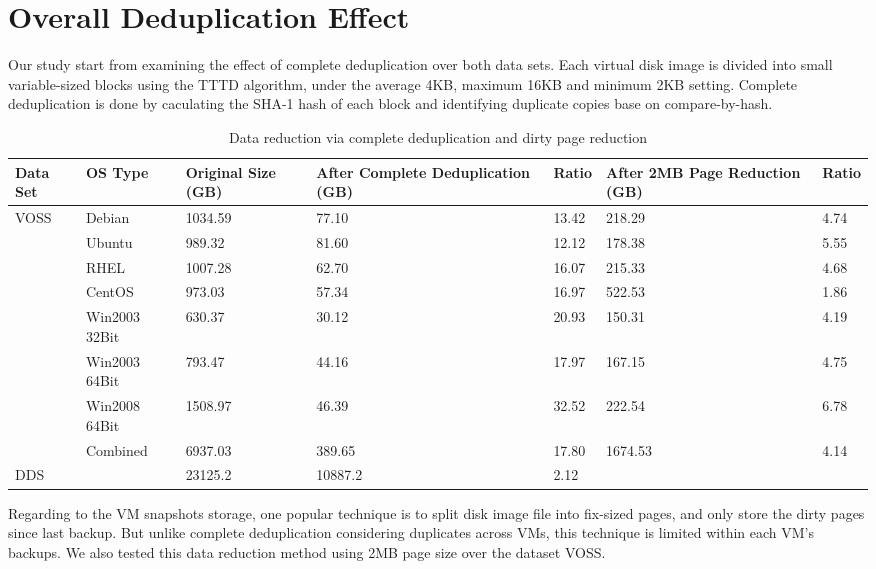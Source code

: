 \section{Overall Deduplication Effect}
Our study start from examining the effect of complete deduplication over both data sets.
Each virtual disk image is divided into small variable-sized blocks using the TTTD algorithm\cite{frame05},
under the average 4KB, maximum 16KB and minimum 2KB setting. Complete deduplication is
done by caculating the SHA-1 hash of each block and identifying duplicate copies base on compare-by-hash.

\begin{table*}[htb]
  \centering
    \begin{tabular}{|l|l|p{0.8in}|p{1.1in}|p{0.3in}|p{0.9in}|p{0.3in}|}
        \hline
        Data Set & OS Type & Original Size \newline (GB) & After Complete \newline Deduplication (GB) & Ratio & After 2MB Page \newline Reduction (GB) & Ratio \\ \hline
        \multirow{8}{*}{VOSS} & Debian & 1034.59 & 77.10 & 13.42 & 218.29 & 4.74 \\ \cline{2-7}
         & Ubuntu & 989.32 & 81.60 & 12.12 & 178.38 & 5.55 \\ \cline{2-7}
         & RHEL & 1007.28 & 62.70 & 16.07 & 215.33 & 4.68 \\ \cline{2-7}
         & CentOS & 973.03 & 57.34 & 16.97 & 522.53 & 1.86 \\ \cline{2-7}
         & Win2003 32Bit & 630.37 & 30.12 & 20.93 & 150.31 & 4.19 \\ \cline{2-7}
         & Win2003 64Bit & 793.47 & 44.16 & 17.97 & 167.15 & 4.75 \\ \cline{2-7}
         & Win2008 64Bit & 1508.97 & 46.39 & 32.52 & 222.54 & 6.78 \\ \cline{2-7}
         & Combined & 6937.03 & 389.65 & 17.80 & 1674.53 & 4.14 \\ \hline
        DDS & ~ & 23125.2 & 10887.2 & 2.12 & ~ & ~ \\
        \hline
    \end{tabular}
    \caption{Data reduction via complete deduplication and dirty page reduction}
    \label{tab:dedup}
\end{table*}

Regarding to the VM snapshots storage, one popular technique is to split disk image file into fix-sized
pages, and only store the dirty pages since last backup. But unlike complete deduplication considering duplicates
across VMs, this technique is limited within each VM's backups. We also tested this data reduction method
using 2MB page size over the dataset VOSS. 

